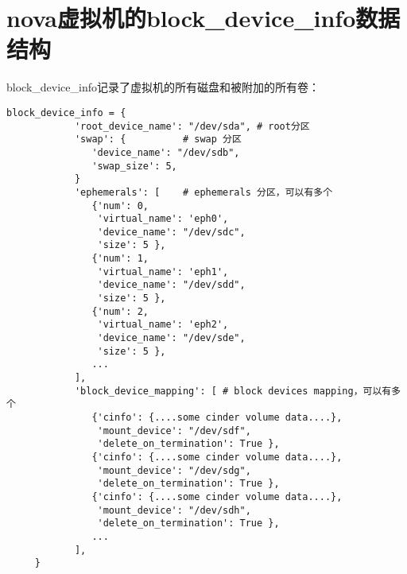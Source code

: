 \documentclass[a4paper,left=1.5cm,right=1.5cm,11pt]{article}
\begin{document}
\section{nova虚拟机的block\_device\_info数据结构}
    block\_device\_info记录了虚拟机的所有磁盘和被附加的所有卷：
    \begin{lstlisting}
block_device_info = { 
            'root_device_name': "/dev/sda", # root分区
            'swap': {          # swap 分区
               'device_name': "/dev/sdb", 
               'swap_size': 5, 
            } 
            'ephemerals': [    # ephemerals 分区，可以有多个
               {'num': 0, 
                'virtual_name': 'eph0', 
                'device_name': "/dev/sdc", 
                'size': 5 }, 
               {'num': 1, 
                'virtual_name': 'eph1', 
                'device_name': "/dev/sdd", 
                'size': 5 }, 
               {'num': 2, 
                'virtual_name': 'eph2', 
                'device_name': "/dev/sde", 
                'size': 5 }, 
               ... 
            ], 
            'block_device_mapping': [ # block devices mapping，可以有多个
               {'cinfo': {....some cinder volume data....}, 
                'mount_device': "/dev/sdf", 
                'delete_on_termination': True }, 
               {'cinfo': {....some cinder volume data....}, 
                'mount_device': "/dev/sdg", 
                'delete_on_termination': True }, 
               {'cinfo': {....some cinder volume data....}, 
                'mount_device': "/dev/sdh", 
                'delete_on_termination': True }, 
               ... 
            ], 
     }
    \end{lstlisting}
\end{document}
